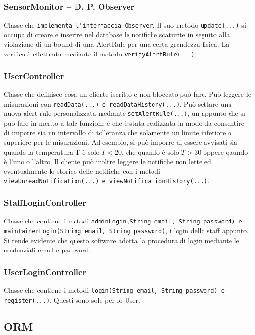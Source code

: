 \documentclass[a4paper, 11pt]{article}
\begin{document}
	\subsubsection{SensorMonitor – D. P. Observer}
	Classe che \texttt{implementa l'interfaccia Observer}. Il suo metodo \texttt{update(...)} si occupa di creare e inserire nel database le notifiche scaturite in seguito alla violazione di un bound di una AlertRule per una certa grandezza fisica. La verifica è effettuata mediante il metodo \texttt{verifyAlertRule(...)}.

	\subsubsection{UserController}
	Classe che definisce cosa un cliente iscritto e non bloccato può fare. Può leggere le misurazioni con \texttt{readData(...) e readDataHistory(...)}. Può settare una nuova alert rule personalizzata mediante \texttt{setAlertRule(...)}, un appunto che si può fare in merito a tale funzione è che è stata realizzata in modo da consentire di imporre sia un intervallo di tolleranza che solamente un limite inferiore o superiore per le misurazioni. Ad esempio, si può imporre di essere avvisati sia quando la temperatura T è solo $T<20$, che quando è solo $T>30$ oppere qaundo è l'uno o l'altro. Il cliente può inoltre leggere le notifiche non lette ed eventualmente lo storico delle notifiche con i metodi \texttt{viewUnreadNotification(...) e viewNotificationHistory(...)}.
	\subsubsection{StaffLoginController}
	Classe che contiene i metodi \texttt{adminLogin(String email, String password) e maintainerLogin(String email, String password)}, i login dello staff appunto. Si rende evidente che questo software adotta la procedura di login mediante le credenziali email e password.
	\subsubsection{UserLoginController}
	Classe che contiene i metodi \texttt{login(String email, String password) e register(...)}. Questi sono solo per lo User.

	\subsection{ORM}
\end{document}
